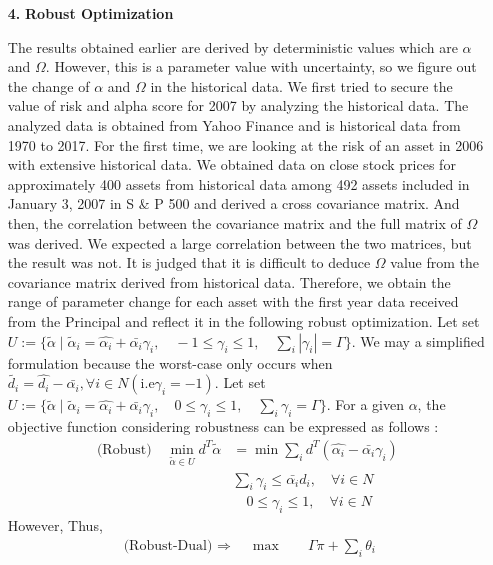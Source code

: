 \documentclass[11pt]{article}
\begin{document}
\begin{itemize}
\item[\textbf{4.}] \textbf{Robust Optimization} 
\item[]The results obtained earlier are derived by deterministic values which are $\alpha$ and $\Omega$. However, this is a parameter value with uncertainty, so we figure out the change of $\alpha$ and $\Omega$ in the historical data.  We first tried to secure the value of risk and alpha score for 2007 by analyzing the historical data. The analyzed data is obtained from Yahoo Finance and is historical data from 1970 to 2017. For the first time, we are looking at the risk of an asset in 2006 with extensive historical data. We obtained data on close stock prices for approximately 400 assets from historical data among 492 assets included in January 3, 2007 in S \& P 500 and derived a cross covariance matrix. And then, the correlation between the covariance matrix and the full matrix of $\Omega$ was derived. We expected a large correlation between the two matrices, but the result was not. It is judged that it is difficult to deduce $\Omega$ value from the covariance matrix derived from historical data. Therefore, we obtain the range of parameter change for each asset with the first year data received from the Principal and reflect it in the following robust optimization. %
Let set $U := \{ \tilde \alpha  \mid \tilde \alpha_i = \hat{\alpha_i} + \bar{\alpha_i}\gamma_i , \quad -1 \leq \gamma_i\leq 1 , \quad \sum_{i} |\gamma_i| = \Gamma \}$. We may a simplified formulation because the worst-case only occurs when $\tilde{d_i} =\hat{d_i} - \bar{\alpha_i}, \forall i \in N (\text{i.e} \gamma_i = -1)$. Let set $U := \{ \tilde \alpha  \mid \tilde \alpha_i = \hat{\alpha_i} + \bar{\alpha_i}\gamma_i , \quad 0 \leq \gamma_i\leq 1 , \quad \sum_{i} \gamma_i = \Gamma \}$. For a given $\alpha$, the objective function considering robustness can be expressed as follows :
\begin{align*}
\text{(Robust)} 
\text{} \quad \min_{\tilde \alpha \in U } d^T \tilde{\alpha} &= \min \sum_{i} d^T (\hat{\alpha_i} - \bar{\alpha_i}\gamma_i ) \\
& \sum_{i} \gamma_i \leq \bar{\alpha_i} d_i , \quad \forall i \in N\\
& \quad 0 \leq \gamma_i\leq 1 , \quad \forall i \in N
\end{align*}
However, %
Thus, %
\begin{align*}
\text{(Robust-Dual) $\Rightarrow$} \quad \max\quad & \Gamma  \pi + \sum_{i} \theta_i  \\

\end{align*}
\end{itemize}
\end{document}
